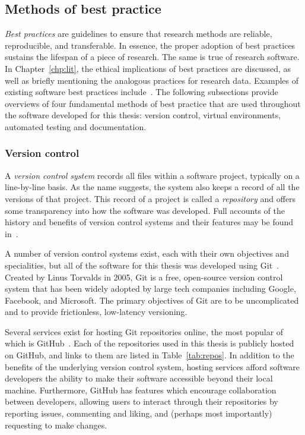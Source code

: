 \subsection{Methods of best practice}

\emph{Best practices} are guidelines to ensure that research methods are
reliable, reproducible, and transferable. In essence, the proper adoption of
best practices sustains the lifespan of a piece of research. The same is true of
research software. In Chapter~\ref{chp:lit}, the ethical implications of best
practices are discussed, as well as briefly mentioning the analogous practices
for research data. Examples of existing software best practices
include~\cite{Aberdour2007,Benureau2018,Jimenez2017,Wilson2014}. The following
subsections provide overviews of four fundamental methods of best practice that
are used throughout the software developed for this thesis: version control,
virtual environments, automated testing and documentation.

\subsubsection{Version control}

A \emph{version control system} records all files within a software project,
typically on a line-by-line basis. As the name suggests, the system also keeps a
record of all the versions of that project. This record of a project is called a
\emph{repository} and offers some transparency into how the software was
developed. Full accounts of the history and benefits of version control systems
and their features may be found in~\cite{Ruparelia2010,Zolkifli2018}.

A number of version control systems exist, each with their own objectives and
specialities, but all of the software for this thesis was developed using
Git~\cite{git}. Created by Linus Torvalds in 2005, Git is a free, open-source
version control system that has been widely adopted by large tech companies
including Google, Facebook, and Microsoft. The primary objectives of Git are to
be uncomplicated and to provide frictionless, low-latency versioning.

Several services exist for hosting Git repositories online, the most popular of
which is GitHub~\cite{github}. Each of the repositories used in this thesis is
publicly hosted on GitHub, and links to them are listed in
Table~\ref{tab:repos}. In addition to the benefits of the underlying version
control system, hosting services afford software developers the ability to make
their software accessible beyond their local machine. Furthermore, GitHub has
features which encourage collaboration between developers, allowing users to
interact through their repositories by reporting issues, commenting and
liking, and (perhaps most importantly) requesting to make changes.

